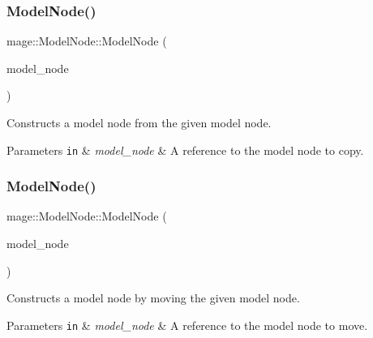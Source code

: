 \subsubsection{\texorpdfstring{Model\+Node()}{ModelNode()}\hspace{0.1cm}{\footnotesize\ttfamily [3/4]}}
{\footnotesize\ttfamily mage\+::\+Model\+Node\+::\+Model\+Node (\begin{DoxyParamCaption}\item[{const \hyperlink{classmage_1_1_model_node}{Model\+Node} \&}]{model\+\_\+node }\end{DoxyParamCaption})}

Constructs a model node from the given model node.


\begin{DoxyParams}[1]{Parameters}
\mbox{\tt in}  & {\em model\+\_\+node} & A reference to the model node to copy. \\
\hline
\end{DoxyParams}
\hypertarget{classmage_1_1_model_node_a19ba577112ea488f227ea31642fb2cb2}{}\label{classmage_1_1_model_node_a19ba577112ea488f227ea31642fb2cb2} 
\subsubsection{\texorpdfstring{Model\+Node()}{ModelNode()}\hspace{0.1cm}{\footnotesize\ttfamily [4/4]}}
{\footnotesize\ttfamily mage\+::\+Model\+Node\+::\+Model\+Node (\begin{DoxyParamCaption}\item[{\hyperlink{classmage_1_1_model_node}{Model\+Node} \&\&}]{model\+\_\+node }\end{DoxyParamCaption})\hspace{0.3cm}{\ttfamily [default]}}

Constructs a model node by moving the given model node.


\begin{DoxyParams}[1]{Parameters}
\mbox{\tt in}  & {\em model\+\_\+node} & A reference to the model node to move. \\
\hline
\end{DoxyParams}
\hypertarget{classmage_1_1_model_node_a131c0062a1bed3d29fade27e602bec44}{}\label{classmage_1_1_model_node_a131c0062a1bed3d29fade27e602bec44} 
